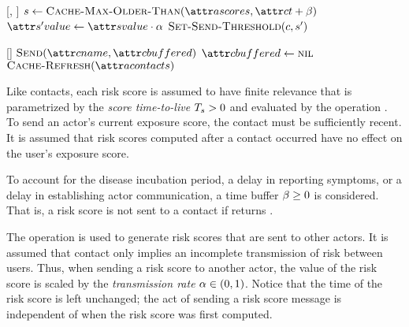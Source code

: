 %
\begin{function}{\nRefreshSendThreshold}[\vActor, \vContact]
        \State $\vScore \assign \cCacheMaxOlderThan[\aActorScores, \aContactTime + \pTimeBuffer]$
        \State $\aNewScoreValue \assign \aScoreValue \cdot \pTransmissionRate$
        \State $\cSetSendThreshold[\vContact, \vNewScore]$    
    \EndIf
\end{function}
%
\begin{function}{\nHandleFlushTimeout}[\vActor]
  \ForEach{$\vContact \in \aActorContacts$}
    \If{$\aContactBuffered \notEquals \nil$}
      \State $\cSend[\aContactName, \aContactBuffered]$
      \State $\aContactBuffered \assign \nil$
    \EndIf
  \EndFor
  \State $\cCacheRefresh[\aActorContacts]$
\end{function}
%
Like contacts, each risk score is assumed to have finite relevance that is parametrized by the \emph{score time-to-live} $T_s > 0$ and evaluated by the operation . To send an actor's current exposure score, the contact must be sufficiently recent. It is assumed that risk scores computed after a contact occurred have no effect on the user's exposure score.

To account for the disease incubation period, a delay in reporting symptoms, or a delay in establishing actor communication, a time buffer $\beta \geq 0$ is considered. That is, a risk score is not sent to a contact if  returns \false.

The  operation is used to generate risk scores that are sent to other actors. It is assumed that contact only implies an incomplete transmission of risk between users. Thus, when sending a risk score to another actor, the value of the risk score is scaled by the \emph{transmission rate} $\alpha \in (0, 1)$. Notice that the time of the risk score is left unchanged; the act of sending a risk score message is independent of when the risk score was first computed.


